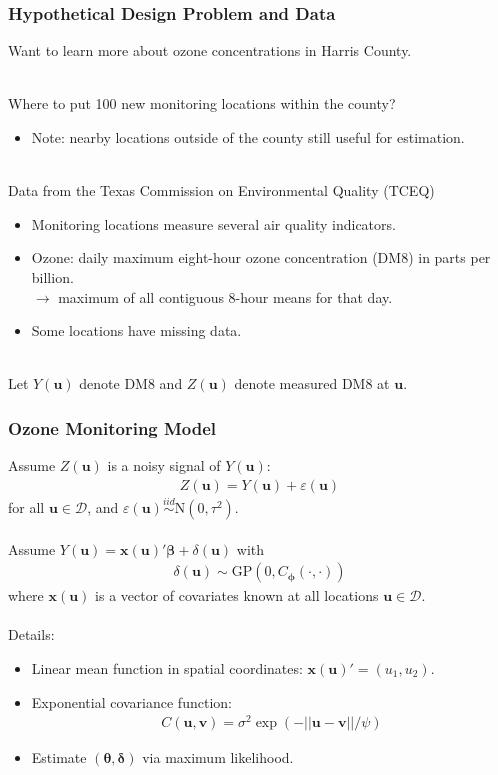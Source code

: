 \documentclass[xcolor=dvipsnames]{beamer}
\begin{document}
\begin{frame}
  \frametitle{Hypothetical Design Problem and Data}
  Want to learn more about ozone concentrations in Harris County.\\~

  Where to put 100 new monitoring locations within the county? \\
  \begin{itemize}
  \item[] Note: nearby locations outside of the county still useful for estimation.\\~\\
  \end{itemize}\pause

  Data from the Texas Commission on Environmental Quality (TCEQ)
  \begin{itemize}
  \item Monitoring locations measure several air quality indicators.
  \item Ozone: daily maximum eight-hour ozone concentration (DM8) in parts per billion.\\
    $\to$ maximum of all contiguous 8-hour means for that day.
  \item Some locations have missing data.\\~\pause 
  \end{itemize}

  Let $Y(\bm{u})$ denote DM8 and $Z(\bm{u})$ denote measured DM8 at $\bm{u}$.
\end{frame}



\begin{frame}
\frametitle{Ozone Monitoring Model}
Assume $Z(\bm{u})$ is a noisy signal of $Y(\bm{u})$:
\begin{align*}
Z(\bm{u}) = Y(\bm{u}) + \varepsilon(\bm{u})
\end{align*}
for all $\bm{u}\in\mathcal{D}$, and $\varepsilon(\bm{u}) \stackrel{iid}{\sim} \mathrm{N}(0, \tau^2)$. \pause\\~\\

Assume $Y(\bm{u}) = \bm{x}(\bm{u})'\bm{\beta} + \delta(\bm{u})$ with
\begin{align*}
\delta(\bm{u}) \sim \mathrm{GP}(0, C_{\bm{\phi}}(\cdot, \cdot))
\end{align*}
where $\bm{x}(\bm{u})$ is a vector of covariates known at all locations $\bm{u}\in\mathcal{D}$.\pause \\~\\ 

Details:
\begin{itemize}
\item Linear mean function in spatial coordinates: $\bm{x}(\bm{u})' = (u_1, u_2)$.
\item Exponential covariance function:
  \begin{align*}
    C(\bm{u},\bm{v}) = \sigma^2\exp(-||\bm{u} - \bm{v}||/\psi)
  \end{align*}
\item Estimate $(\bm{\theta}, \bm{\delta})$ via maximum likelihood.
\end{itemize}
\end{frame}
\end{document}
